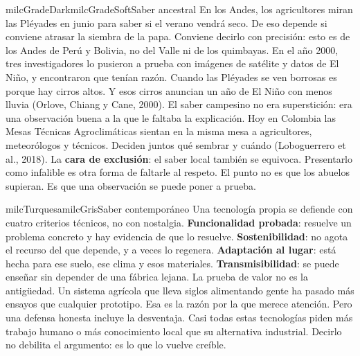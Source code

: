 \documentclass[11pt,letterpaper]{article}
\begin{document}
\begin{softbox}{milcGradeDark}{milcGradeSoft}{Saber ancestral}
En los Andes, los agricultores miran las Pléyades en junio para saber si el verano vendrá seco. De eso depende si conviene atrasar la siembra de la papa. Conviene decirlo con precisión: esto es de los Andes de Perú y Bolivia, no del Valle ni de los quimbayas. En el año 2000, tres investigadores lo pusieron a prueba con imágenes de satélite y datos de El Niño, y encontraron que tenían razón. Cuando las Pléyades se ven borrosas es porque hay cirros altos. Y esos cirros anuncian un año de El Niño con menos lluvia (Orlove, Chiang y Cane, 2000). El saber campesino no era superstición: era una observación buena a la que le faltaba la explicación. Hoy en Colombia las Mesas Técnicas Agroclimáticas sientan en la misma mesa a agricultores, meteorólogos y técnicos. Deciden juntos qué sembrar y cuándo (Loboguerrero et al., 2018). La \textbf{cara de exclusión}: el saber local también se equivoca. Presentarlo como infalible es otra forma de faltarle al respeto. El punto no es que los abuelos supieran. Es que una observación se puede poner a prueba.\par{}
\end{softbox}

\begin{softbox}{milcTurquesa}{milcGris}{Saber contemporáneo}
Una tecnología propia se defiende con cuatro criterios técnicos, no con nostalgia. \textbf{Funcionalidad probada}: resuelve un problema concreto y hay evidencia de que lo resuelve. \textbf{Sostenibilidad}: no agota el recurso del que depende, y a veces lo regenera. \textbf{Adaptación al lugar}: está hecha para ese suelo, ese clima y esos materiales. \textbf{Transmisibilidad}: se puede enseñar sin depender de una fábrica lejana. La prueba de valor no es la antigüedad. Un sistema agrícola que lleva siglos alimentando gente ha pasado más ensayos que cualquier prototipo. Esa es la razón por la que merece atención. Pero una defensa honesta incluye la desventaja. Casi todas estas tecnologías piden más trabajo humano o más conocimiento local que su alternativa industrial. Decirlo no debilita el argumento: es lo que lo vuelve creíble.
\end{softbox}
\end{document}
